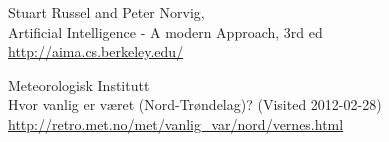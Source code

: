 \begin{thebibliography}{9}

Stuart Russel and Peter Norvig,\\
Artificial Intelligence - A modern Approach, 3rd ed\\
\url{http://aima.cs.berkeley.edu/}

Meteorologisk Institutt\\
Hvor vanlig er været (Nord-Trøndelag)? (Visited 2012-02-28)\\
\url{http://retro.met.no/met/vanlig_var/nord/vernes.html}

\end{thebibliography}